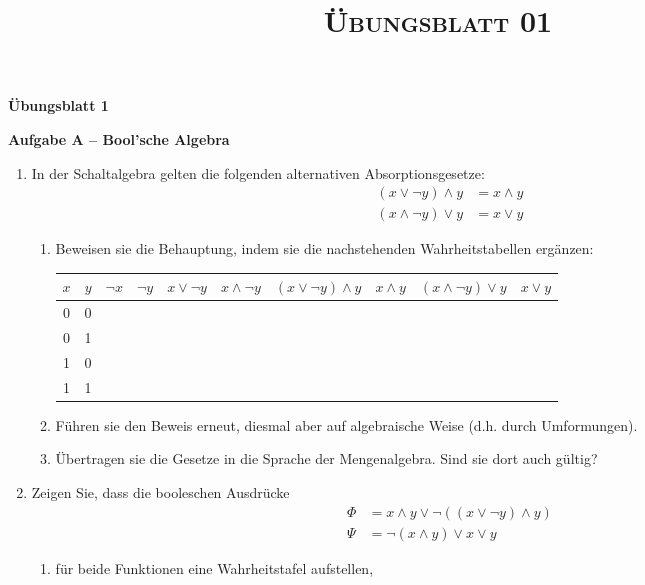 \documentclass[paper=a4,fontsize=11pt]{scrartcl}%
\title{	
\normalfont \normalsize 
\textsc{Übungsblatt 01}
}
\numberwithin{equation}{section}
\begin{document}
\begin{center}
\Large{\textbf{Übungsblatt 1}}
\end{center}

\begin{center}\Large{\textbf{Aufgabe A -- Bool'sche Algebra}}\end{center}\vskip0.25in
\begin{enumerate}
	\item In der Schaltalgebra gelten die folgenden alternativen Absorptionsgesetze:
	\begin{align*}
		(x \lor \neg y) \land y &= x \land y\\
		(x \land \neg y) \lor y &= x \lor y
	\end{align*}
	\begin{enumerate}
		\item Beweisen sie die Behauptung, indem sie die nachstehenden Wahrheitstabellen ergänzen:
	\begin{center}
	\begin{table}[ht]
	\centering
\begin{tabular}{|c|c|c|c|c|c|c|c|c|c|}
\hline
 $x$ & $y$ & $\neg x$ & $\neg y$ & $x \lor \neg y$ & $x \land \neg y$ & $(x \lor \neg y) \land y$ & $x \land y$ & $(x \land \neg y) \lor y$ & $x \lor y$ \\ \hline
0 & 0 &  &  &  &  &  &  &  &  \\ \hline
0 & 1 &  &  &  &  &  &  &  &  \\ \hline
1 & 0 &  &  &  &  &  &  &  &  \\ \hline
1 & 1 &  &  &  &  &  &  &  &  \\ \hline
\end{tabular}
\end{table}
	\end{center}
		\item Führen sie den Beweis erneut, diesmal aber auf algebraische Weise (d.h. durch Umformungen).
		\item Übertragen sie die Gesetze in die Sprache der Mengenalgebra. Sind sie dort auch gültig?
		\end{enumerate}
	\item Zeigen Sie, dass die booleschen Ausdrücke
	\begin{align*}
		\Phi &= x \land y  \lor \neg ((x \lor \neg y) \land y)\\
		\Psi &= \neg (x \land y) \lor x \lor y
	\end{align*}
	\begin{enumerate}
		\item für beide Funktionen eine Wahrheitstafel aufstellen,

\end{enumerate}
\end{enumerate}
\end{document}
